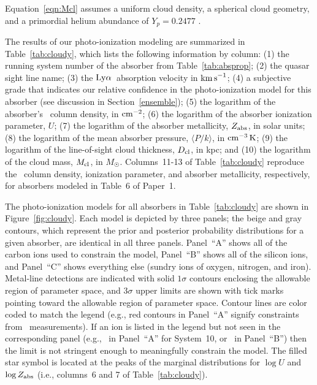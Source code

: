 \documentclass[twocolumn,twocolappendix,tighten,times]{aastex6}
\newcommand{\HI}{\ion{H}{1}}
\newcommand{\CII}{\ion{C}{2}}
\newcommand{\CIV}{\ion{C}{4}}
\newcommand{\SiII}{\ion{Si}{2}}
\newcommand{\kms}{\ensuremath{{\rm km\,s}^{-1}}}
\newcommand{\lya}{\ensuremath{{\rm Ly}\alpha}}
\begin{document}
Equation~\ref{eqn:Mcl} assumes a uniform cloud density, a spherical cloud geometry, 
and a primordial helium abundance of $Y_p=0.2477$ \citep{peimbert07}. 

The results of our photo-ionization modeling are summarized in 
Table~\ref{tab:cloudy}, which lists the following information by column: 
(1) the running system number of the absorber from Table~\ref{tab:absprop}; 
(2) the quasar sight line name; (3) the \lya\ absorption velocity in \kms; 
(4) a subjective grade that indicates our relative confidence in the 
photo-ionization model for this absorber (see discussion in 
Section~\ref{ensemble}); (5) the logarithm of the absorber's 
\HI\ column density, in ${\rm cm}^{-2}$; (6) the logarithm of the absorber 
ionization parameter, $U$; (7) the logarithm of the absorber 
metallicity, $Z_{\rm abs}$, in solar units; (8) the logarithm of the mean 
absorber pressure, $\langle P/k \rangle$, in ${\rm cm^{-3}\,K}$; (9) the 
logarithm of the line-of-sight cloud thickness, $D_{\rm cl}$, in kpc; and 
(10) the logarithm of the cloud mass, $M_{\rm cl}$, in $M_{\Sun}$. 
Columns~11-13 of Table~\ref{tab:cloudy} reproduce the \HI\ column density, 
ionization parameter, and absorber metallicity, respectively, for absorbers 
modeled in Table~6 of Paper~1. 

The photo-ionization models for all absorbers in Table~\ref{tab:cloudy} are shown 
in Figure~\ref{fig:cloudy}. Each model is depicted by three panels; the beige and 
gray contours, which represent the prior and posterior probability distributions
for a given absorber, are identical in all three panels. Panel~``A'' shows all of 
the carbon ions used to constrain the model, Panel~``B'' shows all of the silicon 
ions, and Panel~``C'' shows everything else (sundry ions of oxygen, nitrogen, and 
iron). Metal-line detections are indicated with solid $1\sigma$ contours 
enclosing the allowable region of parameter space, and $3\sigma$ upper limits are 
shown with tick marks pointing toward the allowable region of parameter space. 
Contour lines are color coded to match the legend (e.g., red contours in 
Panel~``A'' signify constraints from \CIV\ measurements). If an ion is listed in 
the legend but not seen in the corresponding panel (e.g., \CII\ in Panel~``A'' for 
System~10, or \SiII\ in Panel~``B'') then the limit is not stringent enough to 
meaningfully constrain the model. The filled star symbol is located at the peaks 
of the marginal distributions for $\log{U}$ and $\log{Z_{\rm abs}}$ (i.e., 
columns~6 and 7 of Table~\ref{tab:cloudy}).
\end{document}
